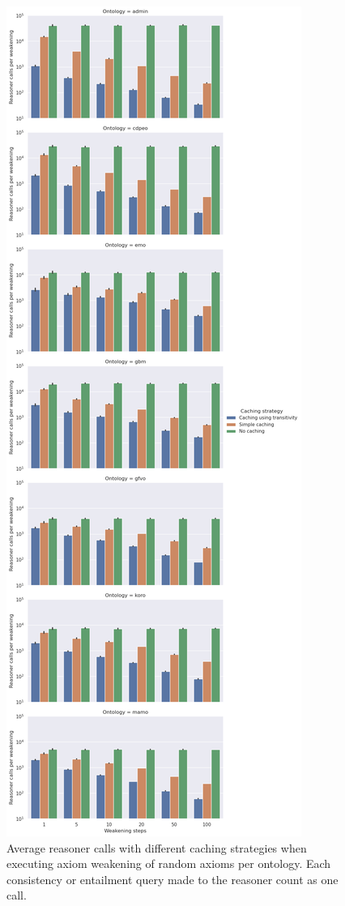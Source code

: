 \begin{figure}[ht]
    \begin{widepage}
      \centering
      \includegraphics[height=0.9\textheight]{resources/calls-cache-ontology-bar.png}
    \end{widepage}
    \caption{Average reasoner calls with different caching strategies when executing axiom weakening of random axioms per ontology. Each consistency or entailment query made to the reasoner count as one call.}
\end{figure}

